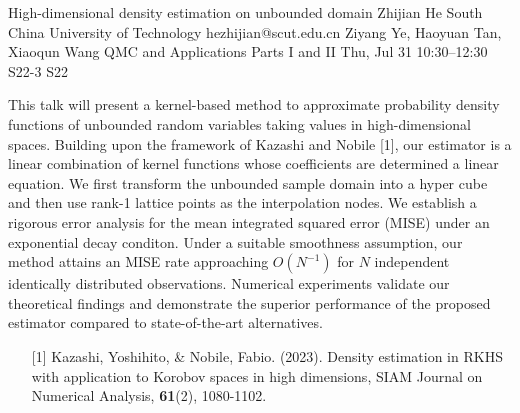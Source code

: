 \begin{talk}
  {High-dimensional density estimation on  unbounded domain}%
  {Zhijian He}%
  {South China University of Technology}%
  {hezhijian@scut.edu.cn}%
  {Ziyang Ye, Haoyuan Tan, Xiaoqun Wang}%
  {QMC and Applications Parts I and II}%
  {Thu, Jul 31 10:30–12:30}%
  {S22-3}%
  {S22}%
				
			
This talk will present a kernel-based method to approximate probability density functions of unbounded random variables taking values in high-dimensional spaces. Building upon the framework of Kazashi and Nobile [1], our estimator is a linear combination of kernel functions whose coefficients are determined a linear equation. We first transform the unbounded sample domain into a hyper cube and then use rank-1 lattice points as the interpolation nodes.
We establish a rigorous error analysis for the mean integrated squared error (MISE) under an exponential decay conditon.  Under a suitable smoothness assumption, our method attains an MISE rate  approaching $O(N^{-1})$ for $N$ independent identically distributed observations. Numerical experiments validate our theoretical findings and demonstrate the superior performance of the proposed estimator compared to state-of-the-art alternatives.
\medskip


\begin{enumerate}
	\item[{[1]}] Kazashi, Yoshihito, \& Nobile, Fabio. (2023). Density estimation in {RKHS} with application to Korobov spaces in high dimensions, SIAM Journal on Numerical Analysis, \textbf{61}(2), 1080-1102.
\end{enumerate}

\end{talk}

